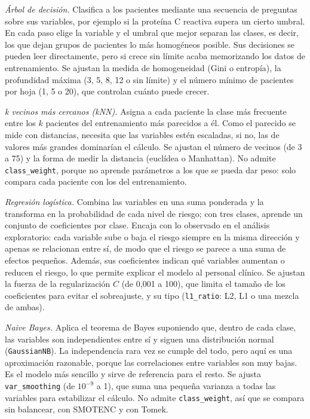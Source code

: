 \documentclass[journal,onecolumn]{IEEEtran}
\makeatletter
\def\subsubsection{\@startsection{subsubsection}{3}{\z@}{1.2ex plus 0.3ex minus
0.2ex}{0.4ex}{\normalfont\normalsize\itshape}}
\makeatother
\begin{document}
\subsubsection{Modelos base}

\textit{Árbol de decisión.} Clasifica a los pacientes mediante una secuencia de preguntas sobre
sus variables, por ejemplo si la proteína C reactiva supera un cierto umbral.
En cada paso elige la variable y el umbral que mejor separan las clases, es decir, los que dejan
grupos de pacientes lo más homogéneos posible.
Sus decisiones se pueden leer directamente, pero si crece sin límite acaba memorizando los datos de
entrenamiento.
Se ajustan la medida de homogeneidad (Gini o entropía), la profundidad máxima (3, 5, 8, 12 o sin
límite) y el número mínimo de pacientes por hoja (1, 5 o 20), que controlan cuánto puede crecer.

\textit{k vecinos más cercanos (kNN).} Asigna a cada paciente la clase más frecuente entre los $k$
pacientes del entrenamiento más parecidos a él.
Como el parecido se mide con distancias, necesita que las variables estén escaladas, si no, las de
valores más grandes dominarían el cálculo.
Se ajustan el número de vecinos (de 3 a 75) y la forma de medir la distancia (euclídea o
Manhattan).
No admite \texttt{class\_weight}, porque no aprende parámetros a los que se pueda dar peso: solo
compara cada paciente con los del entrenamiento.

\textit{Regresión logística.} Combina las variables en una suma ponderada y la transforma en la
probabilidad de cada nivel de riesgo; con tres clases, aprende un conjunto de coeficientes por clase.
Encaja con lo observado en el análisis exploratorio: cada variable sube o baja el riesgo siempre en la
misma dirección y apenas se relacionan entre sí, de modo que el riesgo se parece a una suma de
efectos pequeños.
Además, sus coeficientes indican qué variables aumentan o reducen el riesgo, lo que permite explicar
el modelo al personal clínico.
Se ajustan la fuerza de la regularización $C$ (de 0,001 a 100), que limita el tamaño de los
coeficientes para evitar el sobreajuste, y su tipo (\texttt{l1\_ratio}: L2, L1 o una mezcla de
ambas).

\textit{Naive Bayes.} Aplica el teorema de Bayes suponiendo que, dentro de cada clase, las variables
son independientes entre sí y siguen una distribución normal (\texttt{GaussianNB}).
La independencia rara vez se cumple del todo, pero aquí es una aproximación razonable, porque las
correlaciones entre variables son muy bajas.
Es el modelo más sencillo y sirve de referencia para el resto.
Se ajusta \texttt{var\_smoothing} (de $10^{-9}$ a 1), que suma una pequeña varianza a todas las
variables para estabilizar el cálculo.
No admite \texttt{class\_weight}, así que se compara sin balancear, con SMOTENC y con Tomek.
\end{document}
